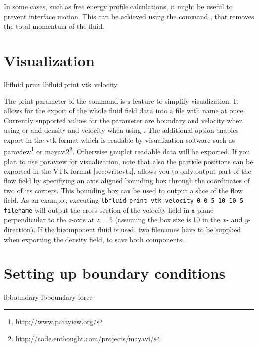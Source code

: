 In some cases, such as free energy profile calculations, it might be useful to
prevent interface motion. This can be achieved using the command , that removes the total momentum of the fluid.


\section{Visualization}
\label{ssec:LBvisualization}
\begin{essyntax}
   lbfluid print   
   lbfluid print vtk velocity  
\end{essyntax}
The print parameter of the  command is a feature to simplify
visualization. It allows for the export of the whole fluid field data into a
file with name  at once. Currently supported values for the 
parameter  are boundary and velocity when using  or
 and density and velocity when using . The additional
option  enables export in the vtk format which is readable by
visualization software such as paraview\footnote{http://www.paraview.org/} or
mayavi2\footnote{http://code.enthought.com/projects/mayavi/}. Otherwise gnuplot
readable data will be 
exported. If you plan to use paraview for visualization, note that also the 
particle positions can be exported in the VTK format \ref{sec:writevtk}.
 allows you to only output part of the flow field by specifiying an
axis aligned bounding box through the coordinates of two of its corners. This
bounding box can be used to output a slice of the flow field. As an example,
executing \texttt{lbfluid print vtk velocity 0 0 5 10 10 5 filename} will
output the cross-section of the velocity field in a plane perpendicular to the
$z$-axis at $z = 5$ (assuming the box size is 10 in the $x$- and
$y$-direction).  If the  bicomponent fluid is used, two filenames
have to be supplied when exporting the density field, to save both components.

\section{Setting up boundary conditions}
\begin{essyntax}
   lbboundary   
   lbboundary force 
  \begin{features}
  \end{features}
\end{essyntax}

